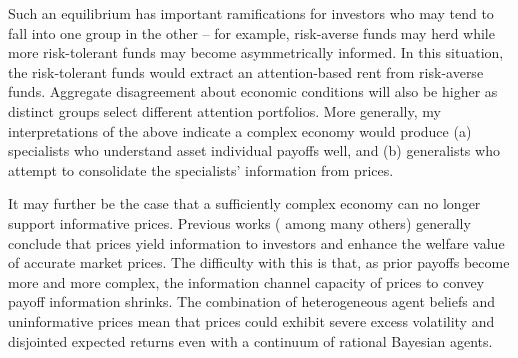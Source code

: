 \documentclass{article}
\begin{document}
Such an equilibrium has important ramifications for investors who may tend to fall into one group in the other -- for example, risk-averse funds may herd while more risk-tolerant funds may become asymmetrically informed. In this situation, the risk-tolerant funds would extract an attention-based rent from risk-averse funds. Aggregate disagreement about economic conditions will also be higher as distinct groups select different attention portfolios. More generally, my interpretations of the above indicate a complex economy would produce (a) specialists who understand asset individual payoffs well, and (b) generalists who attempt to consolidate the specialists' information from prices.



It may further be the case that a sufficiently complex economy can no longer support informative prices. Previous works (\textcite{admati_noisy_1985, hellwig1980, kacperczyk_rational_2016} among many others) generally conclude that prices yield information to investors and enhance the welfare value of accurate market prices. The difficulty with this is that, as prior payoffs become more and more complex, the information channel capacity of prices to convey payoff information shrinks. The combination of heterogeneous agent beliefs and uninformative prices mean that prices could exhibit severe excess volatility and disjointed expected returns even with a continuum of rational Bayesian agents. 
\end{document}
